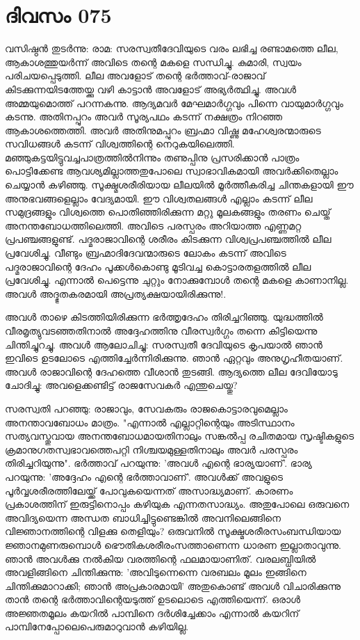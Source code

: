 \newpage
\section{ദിവസം 075}


വസിഷ്ഠന്‍ തുടര്‍ന്നു: രാമ: സരസ്വതീദേവിയുടെ വരം ലഭിച്ച രണ്ടാമത്തെ ലീല, ആകാശത്തുയര്‍ന്ന് അവിടെ തന്റെ മകളെ സന്ധിച്ചു. കുമാരി, സ്വയം പരിചയപ്പെടുത്തി. ലീല അവളോട്‌ തന്റെ ഭര്‍ത്താവ്‌-രാജാവ്‌ കിടക്കുന്നയിടത്തേയ്ക്കു വഴി കാട്ടാന്‍ അവളോട്‌ അഭ്യര്‍ത്ഥിച്ചു. അവള്‍ അമ്മയുമൊത്ത്‌ പറന്നകന്നു. ആദ്യമവര്‍ മേഘമാര്‍ഗ്ഗവും പിന്നെ വായുമാര്‍ഗ്ഗവും കടന്നു. അതിനപ്പുറം അവര്‍ സൂര്യപഥം കടന്ന് നക്ഷത്രം നിറഞ്ഞ ആകാശത്തെത്തി. അവര്‍ അതിനുമപ്പുറം ബ്രഹ്മാ വിഷ്ണു മഹേശ്വരന്മാരുടെ സവിധങ്ങള്‍ കടന്ന് വിശ്വത്തിന്റെ നെറുകയിലെത്തി. മഞ്ഞുകട്ടയിട്ടുവച്ചപാത്രത്തില്‍നിന്നും തണുപ്പിനു പ്രസരിക്കാന്‍ പാത്രം പൊട്ടിക്കേണ്ട ആവശ്യമില്ലാത്തതുപോലെ സ്വാഭാവികമായി അവര്‍ക്കിതെല്ലാം ചെയ്യാന്‍ കഴിഞ്ഞു. സൂക്ഷ്മശരീരിയായ ലീലയില്‍ മൂര്‍ത്തീകരിച്ച ചിന്തകളായി ഈ അനുഭവങ്ങളെല്ലാം വേദ്യമായി. ഈ വിശ്വതലങ്ങള്‍ എല്ലാം കടന്ന് ലീല സമുദ്രങ്ങളും വിശ്വത്തെ പൊതിഞ്ഞിരിക്കുന്ന മറ്റു മൂലകങ്ങളും തരണം ചെയ്ത്‌ അനന്തബോധത്തിലെത്തി. അവിടെ പരസ്പരം അറിയാത്ത എണ്ണമറ്റ പ്രപഞ്ചങ്ങളുണ്ട്‌. പദ്മരാജാവിന്റെ ശരീരം കിടക്കുന്ന വിശ്വപ്രപഞ്ചത്തില്‍ ലീല പ്രവേശിച്ചു. വീണ്ടും ബ്രഹ്മാദിദേവന്മാരുടെ ലോകം കടന്ന് അവിടെ പദ്മരാജാവിന്റെ ദേഹം പൂക്കള്‍കൊണ്ടു മൂടിവച്ച കൊട്ടാരതളത്തില്‍ ലീല പ്രവേശിച്ചു. എന്നാല്‍ പെട്ടെന്നു ചുറ്റും നോക്കുമ്പോള്‍ തന്റെ മകളെ കാണാനില്ല. അവള്‍ അദ്ഭുതകരമായി അപ്രത്യക്ഷയായിരിക്കുന്നു!. 

അവള്‍ താഴെ കിടത്തിയിരിക്കുന്ന ഭര്‍ത്തൃദേഹം തിരിച്ചറിഞ്ഞു. യുദ്ധത്തില്‍ വീരമൃത്യുവടഞ്ഞതിനാല്‍ അദ്ദേഹത്തിനു വീരസ്വര്‍ഗ്ഗം തന്നെ കിട്ടിയെന്നു ചിന്തിച്ചുറച്ചു. അവള്‍ ആലോചിച്ചു: സരസ്വതീ ദേവിയുടെ കൃപയാല്‍ ഞാന്‍ ഇവിടെ ഉടലോടെ എത്തിച്ചേര്‍ന്നിരിക്കുന്നു. ഞാന്‍ ഏറ്റവും അനുഗൃഹീതയാണ്‌. അവള്‍ രാജാവിന്റെ ദേഹത്തെ വീശാന്‍ തുടങ്ങി. ആദ്യത്തെ ലീല ദേവിയോടു ചോദിച്ചു: അവളെക്കണ്ടിട്ട്‌ രാജസേവകര്‍ എന്തുചെയ്തു?

സരസ്വതി പറഞ്ഞു: രാജാവും, സേവകരും രാജകൊട്ടാരവുമെല്ലാം അനന്താവബോധം മാത്രം. "എന്നാല്‍ എല്ലാറ്റിന്റെയും അടിസ്ഥാനം സത്യവസ്തുവായ അനന്തബോധമായതിനാലും സങ്കല്‍പ്പ രചിതമായ സൃഷ്ടികളുടെ ക്രമാനുഗതസ്വഭാവത്തെപറ്റി നിശ്ചയമുള്ളതിനാലും അവര്‍ പരസ്പരം തിരിച്ചറിയുന്നു". ഭര്‍ത്താവ്‌ പറയുന്നു: 'അവള്‍ എന്റെ ഭാര്യയാണ്‌'. ഭാര്യ പറയുന്നു: 'അദ്ദേഹം എന്റെ ഭര്‍ത്താവാണ്‌'. അവള്‍ക്ക്‌ അവളുടെ പൂര്‍വ്വശരീരത്തിലേയ്ക്ക്‌ പോവുകയെന്നത്‌ അസാദ്ധ്യമാണ്‌. കാരണം പ്രകാശത്തിന്‌ ഇരുട്ടിനൊപ്പം കഴിയുക എന്നതസാദ്ധ്യം. അതുപോലെ ഒരുവനെ അവിദ്യയെന്ന അന്ധത ബാധിച്ചിട്ടുണ്ടെങ്കില്‍ അവനിലെങ്ങിനെ വിജ്ഞാനത്തിന്റെ വിളക്കു തെളിയും? ഒരുവനില്‍ സൂക്ഷ്മശരീരസംബന്ധിയായ ജ്ഞാനമുണരുമ്പൊള്‍ ഭൌതികശരീരംസത്താണെന്ന ധാരണ ഇല്ലാതാവുന്നു. ഞാന്‍ അവള്‍ക്കു നല്‍കിയ വരത്തിന്റെ ഫലമായാണിത്‌. വരലബ്ധിയില്‍ അവളിങ്ങിനെ ചിന്തിക്കുന്നു: 'അവിടുന്നെന്നെ വരബലം മൂലം ഇങ്ങിനെ ചിന്തിക്കുമാറാക്കി; ഞാന്‍ അപ്രകാരമായി' അതുകൊണ്ട്‌ അവള്‍ വിചാരിക്കുന്നു താന്‍ തന്റെ ഭര്‍ത്താവിന്റെയടുത്ത്‌ ഉടലൊടെ എത്തിയെന്ന്. ഒരാള്‍ അജ്ഞതമൂലം കയറില്‍ പാമ്പിനെ ദര്‍ശിച്ചേക്കാം എന്നാല്‍ കയറിന്‌ പാമ്പിനേപ്പോലെപെരുമാറുവാന്‍ കഴിയില്ല. 


